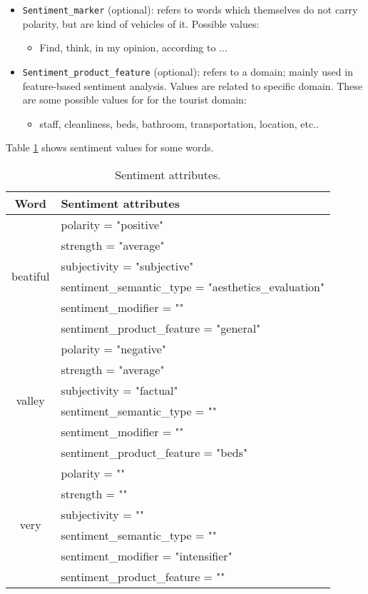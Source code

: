 \begin{itemize}
\begin{itemize}
  \end{itemize}
\item \texttt{Sentiment\_marker} (optional): refers to words which
  themselves do not carry polarity, but are kind of vehicles of it. Possible
  values:
  \begin{itemize}
  \item Find, think, in my opinion, according to ...
  \end{itemize}
\item \texttt{Sentiment\_product\_feature} (optional): refers to a domain;
  mainly used in feature-based sentiment analysis. Values are related to
  specific domain. These are some possible values for for the tourist
  domain:
  \begin{itemize}
  \item staff, cleanliness, beds, bathroom, transportation, location, etc..
  \end{itemize}
\end{itemize}

Table \ref{tab:sent-attr-some} shows sentiment values for some words.

\begin{table}[t]
  \centering
  \ttfamily
  \small
  \begin{tabular}{|c|l|}
    \hline
    \textrm{Word} & \textrm{Sentiment attributes}\\
    \hline
    \multirow{6}{*}{\textrm{beatiful}} & polarity = "positive" \\
    & strength = "average" \\
    & subjectivity = "subjective"\\
    & sentiment\_semantic\_type = "aesthetics\_evaluation"\\
    & sentiment\_modifier = ""\\
    & sentiment\_product\_feature = "general"\\
    \hline
    \multirow{6}{*}{\textrm{valley}} & polarity = "negative"\\
    & strength = "average"\\
    & subjectivity = "factual"\\
    & sentiment\_semantic\_type = ""\\
    & sentiment\_modifier = ""\\
    & sentiment\_product\_feature = "beds"\\
    \hline
    \multirow{6}{*}{\textrm{very}} & polarity = ""\\
    & strength = ""\\
    & subjectivity = ""\\
    & sentiment\_semantic\_type = ""\\
    & sentiment\_modifier = "intensifier"\\
    & sentiment\_product\_feature = ""\\
    \hline
  \end{tabular}
  \caption{\textrm{Sentiment attributes.}}
  \label{tab:sent-attr-some}
\end{table}


